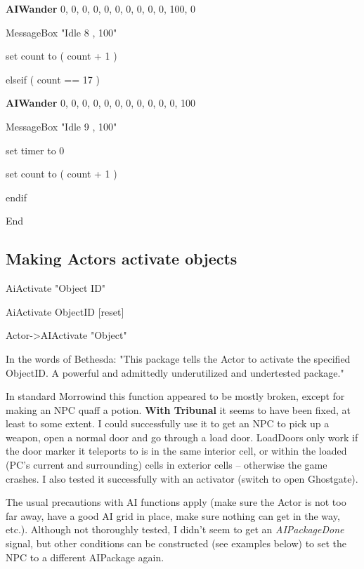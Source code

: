 \documentclass[
]{article}
\begin{document}
\textbf{AIWander} 0, 0, 0, 0, 0, 0, 0, 0, 0, 0, 100, 0

MessageBox "Idle 8 , 100"

set count to ( count + 1 )

elseif ( count == 17 )

\textbf{AIWander} 0, 0, 0, 0, 0, 0, 0, 0, 0, 0, 0, 100

MessageBox "Idle 9 , 100"

set timer to 0

set count to ( count + 1 )

endif

End

\hypertarget{making-actors-activate-objects}{%
\subsection{\texorpdfstring{\hfill\break
Making Actors activate
objects}{ Making Actors activate objects}}\label{making-actors-activate-objects}}

AiActivate "Object ID"

AiActivate ObjectID {[}reset{]}

Actor-\textgreater AIActivate "Object"

In the words of Bethesda: "This package tells the Actor to activate the
specified ObjectID. A powerful and admittedly underutilized and
undertested package."

In standard Morrowind this function appeared to be mostly broken, except
for making an NPC quaff a potion. \textbf{With Tribunal} it seems to
have been fixed, at least to some extent. I could successfully use it to
get an NPC to pick up a weapon, open a normal door and go through a load
door. LoadDoors only work if the door marker it teleports to is in the
same interior cell, or within the loaded (PC's current and surrounding)
cells in exterior cells -- otherwise the game crashes. I also tested it
successfully with an activator (switch to open Ghostgate).

The usual precautions with AI functions apply (make sure the Actor is
not too far away, have a good AI grid in place, make sure nothing can
get in the way, etc.). Although not thoroughly tested, I didn't seem to
get an \emph{AIPackageDone} signal, but other conditions can be
constructed (see examples below) to set the NPC to a different AIPackage
again.
\end{document}
